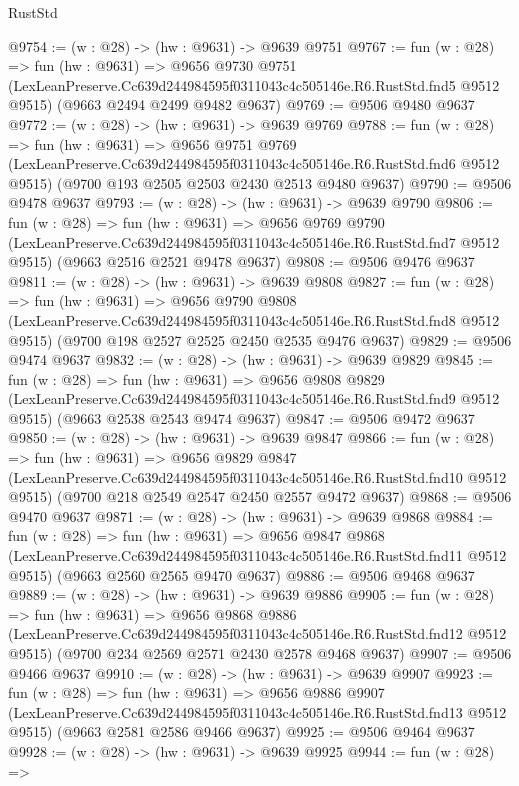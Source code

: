 \begin{lexlean}{RustStd}
\begin{coremodule}
@9754 := (w : @28) -> (hw : @9631) -> @9639 @9751
@9767 := fun (w : @28) =>
  fun (hw : @9631) =>
  @9656
    @9730
    @9751
    (LexLeanPreserve.Cc639d244984595f0311043c4c505146e.R6.RustStd.fnd5 @9512 @9515)
    (@9663 @2494 @2499 @9482 @9637)
@9769 := @9506 @9480 @9637
@9772 := (w : @28) -> (hw : @9631) -> @9639 @9769
@9788 := fun (w : @28) =>
  fun (hw : @9631) =>
  @9656
    @9751
    @9769
    (LexLeanPreserve.Cc639d244984595f0311043c4c505146e.R6.RustStd.fnd6 @9512 @9515)
    (@9700 @193 @2505 @2503 @2430 @2513 @9480 @9637)
@9790 := @9506 @9478 @9637
@9793 := (w : @28) -> (hw : @9631) -> @9639 @9790
@9806 := fun (w : @28) =>
  fun (hw : @9631) =>
  @9656
    @9769
    @9790
    (LexLeanPreserve.Cc639d244984595f0311043c4c505146e.R6.RustStd.fnd7 @9512 @9515)
    (@9663 @2516 @2521 @9478 @9637)
@9808 := @9506 @9476 @9637
@9811 := (w : @28) -> (hw : @9631) -> @9639 @9808
@9827 := fun (w : @28) =>
  fun (hw : @9631) =>
  @9656
    @9790
    @9808
    (LexLeanPreserve.Cc639d244984595f0311043c4c505146e.R6.RustStd.fnd8 @9512 @9515)
    (@9700 @198 @2527 @2525 @2450 @2535 @9476 @9637)
@9829 := @9506 @9474 @9637
@9832 := (w : @28) -> (hw : @9631) -> @9639 @9829
@9845 := fun (w : @28) =>
  fun (hw : @9631) =>
  @9656
    @9808
    @9829
    (LexLeanPreserve.Cc639d244984595f0311043c4c505146e.R6.RustStd.fnd9 @9512 @9515)
    (@9663 @2538 @2543 @9474 @9637)
@9847 := @9506 @9472 @9637
@9850 := (w : @28) -> (hw : @9631) -> @9639 @9847
@9866 := fun (w : @28) =>
  fun (hw : @9631) =>
  @9656
    @9829
    @9847
    (LexLeanPreserve.Cc639d244984595f0311043c4c505146e.R6.RustStd.fnd10 @9512 @9515)
    (@9700 @218 @2549 @2547 @2450 @2557 @9472 @9637)
@9868 := @9506 @9470 @9637
@9871 := (w : @28) -> (hw : @9631) -> @9639 @9868
@9884 := fun (w : @28) =>
  fun (hw : @9631) =>
  @9656
    @9847
    @9868
    (LexLeanPreserve.Cc639d244984595f0311043c4c505146e.R6.RustStd.fnd11 @9512 @9515)
    (@9663 @2560 @2565 @9470 @9637)
@9886 := @9506 @9468 @9637
@9889 := (w : @28) -> (hw : @9631) -> @9639 @9886
@9905 := fun (w : @28) =>
  fun (hw : @9631) =>
  @9656
    @9868
    @9886
    (LexLeanPreserve.Cc639d244984595f0311043c4c505146e.R6.RustStd.fnd12 @9512 @9515)
    (@9700 @234 @2569 @2571 @2430 @2578 @9468 @9637)
@9907 := @9506 @9466 @9637
@9910 := (w : @28) -> (hw : @9631) -> @9639 @9907
@9923 := fun (w : @28) =>
  fun (hw : @9631) =>
  @9656
    @9886
    @9907
    (LexLeanPreserve.Cc639d244984595f0311043c4c505146e.R6.RustStd.fnd13 @9512 @9515)
    (@9663 @2581 @2586 @9466 @9637)
@9925 := @9506 @9464 @9637
@9928 := (w : @28) -> (hw : @9631) -> @9639 @9925
@9944 := fun (w : @28) =>

\end{coremodule}
\end{lexlean}
